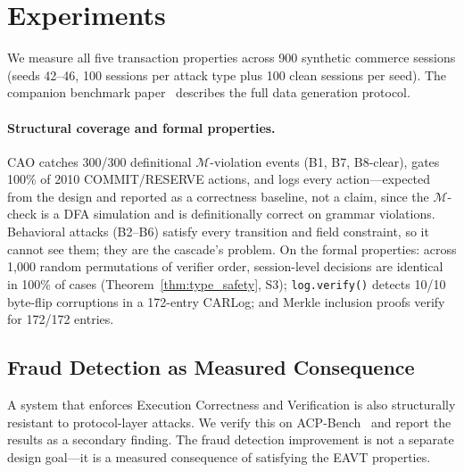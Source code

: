 \documentclass{article}
\begin{document}
\section{Experiments}
\label{sec:experiments}

We measure all five transaction properties across 900 synthetic commerce sessions (seeds 42--46, 100 sessions per attack type plus 100 clean sessions per seed). The companion benchmark paper~\cite{acpbench} describes the full data generation protocol.

\paragraph{Structural coverage and formal properties.}
CAO catches 300/300 definitional $\mathcal{M}$-violation events (B1, B7, B8-clear), gates
100\% of 2010 COMMIT/RESERVE actions, and logs every action---expected from the design and
reported as a correctness baseline, not a claim, since the $\mathcal{M}$-check is a DFA
simulation and is definitionally correct on grammar violations. Behavioral attacks (B2--B6)
satisfy every transition and field constraint, so it cannot see them; they are the cascade's
problem. On the formal properties: across 1,000 random permutations of verifier order,
session-level decisions are identical in 100\% of cases (Theorem~\ref{thm:type_safety},
S3); \texttt{log.verify()} detects 10/10 byte-flip corruptions in a 172-entry CARLog; and
Merkle inclusion proofs verify for 172/172 entries.

\subsection{Fraud Detection as Measured Consequence}

A system that enforces Execution Correctness and Verification is also structurally resistant to protocol-layer attacks. We verify this on ACP-Bench~\cite{acpbench} and report the results as a secondary finding. The fraud detection improvement is not a separate design goal---it is a measured consequence of satisfying the EAVT properties.
\end{document}

